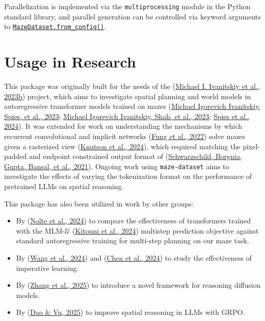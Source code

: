 \documentclass[10pt,a4paper,onecolumn]{article}
\begin{document}
Parallelization is implemented via the \texttt{multiprocessing} module
in the Python standard library, and parallel generation can be
controlled via keyword arguments to
\href{https://understanding-search.github.io/maze-dataset/maze_dataset.html\#MazeDataset.from_config}{\texttt{MazeDataset.from\_config()}}.

\newpage

\hypertarget{usage-in-research}{%
\section{Usage in Research}\label{usage-in-research}}

This package was originally built for the needs of the
(\protect\hyperlink{ref-maze-transformer-github}{Michael I. Ivanitskiy
et al., 2023b}) project, which aims to investigate spatial planning and
world models in autoregressive transformer models trained on mazes
(\protect\hyperlink{ref-ivanitskiy2023structuredworldreps}{Michael
Igorevich Ivanitskiy, Spies, et al., 2023};
\protect\hyperlink{ref-maze-dataset-arxiv-2023}{Michael Igorevich
Ivanitskiy, Shah, et al., 2023};
\protect\hyperlink{ref-spies2024causalworldmodels}{Spies et al., 2024}).
It was extended for work on understanding the mechanisms by which
recurrent convolutional and implicit networks
(\protect\hyperlink{ref-fung2022jfb}{Fung et al., 2022}) solve mazes
given a rasterized view
(\protect\hyperlink{ref-knutson2024logicalextrapolation}{Knutson et al.,
2024}), which required matching the pixel-padded and endpoint
constrained output format of
(\protect\hyperlink{ref-easy_to_hard}{Schwarzschild, Borgnia, Gupta,
Bansal, et al., 2021}). Ongoing work using \texttt{maze-dataset} aims to
investigate the effects of varying the tokenization format on the
performance of pretrained LLMs on spatial reasoning.

This package has also been utilized in work by other groups:

\begin{itemize}
\item
  By (\protect\hyperlink{ref-nolte2024multistep}{Nolte et al., 2024}) to
  compare the effectiveness of transformers trained with the
  MLM-\(\mathcal{U}\)
  (\protect\hyperlink{ref-MLMU-kitouni2024factorization}{Kitouni et al.,
  2024}) multistep prediction objective against standard autoregressive
  training for multi-step planning on our maze task.
\item
  By (\protect\hyperlink{ref-wang2024imperative}{Wang et al., 2024}) and
  (\protect\hyperlink{ref-chen2024iaimperative}{Chen et al., 2024}) to
  study the effectiveness of imperative learning.
\item
  By (\protect\hyperlink{ref-zhang2025tscend}{Zhang et al., 2025}) to
  introduce a novel framework for reasoning diffusion models.
\item
  By (\protect\hyperlink{ref-dao2025alphamaze}{Dao \& Vu, 2025}) to
  improve spatial reasoning in LLMs with GRPO.
\end{itemize}
\end{document}
